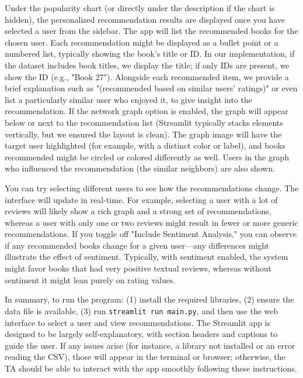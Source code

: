 \documentclass[11pt]{article}
\begin{document}
Under the popularity chart (or directly under the description if the chart is hidden), the personalized recommendation results are displayed once you have selected a user from the sidebar. The app will list the recommended books for the chosen user. Each recommendation might be displayed as a bullet point or a numbered list, typically showing the book’s title or ID. In our implementation, if the dataset includes book titles, we display the title; if only IDs are present, we show the ID (e.g., "Book 27"). Alongside each recommended item, we provide a brief explanation such as "(recommended based on similar users’ ratings)" or even list a particularly similar user who enjoyed it, to give insight into the recommendation. If the network graph option is enabled, the graph will appear below or next to the recommendation list (Streamlit typically stacks elements vertically, but we ensured the layout is clean). The graph image will have the target user highlighted (for example, with a distinct color or label), and books recommended might be circled or colored differently as well. Users in the graph who influenced the recommendation (the similar neighbors) are also shown.

You can try selecting different users to see how the recommendations change. The interface will update in real-time. For example, selecting a user with a lot of reviews will likely show a rich graph and a strong set of recommendations, whereas a user with only one or two reviews might result in fewer or more generic recommendations. If you toggle off "Include Sentiment Analysis," you can observe if any recommended books change for a given user—any differences might illustrate the effect of sentiment. Typically, with sentiment enabled, the system might favor books that had very positive textual reviews, whereas without sentiment it might lean purely on rating values.

In summary, to run the program: (1) install the required libraries, (2) ensure the data file is available, (3) run \texttt{streamlit run main.py}, and then use the web interface to select a user and view recommendations. The Streamlit app is designed to be largely self-explanatory, with section headers and captions to guide the user. If any issues arise (for instance, a library not installed or an error reading the CSV), those will appear in the terminal or browser; otherwise, the TA should be able to interact with the app smoothly following these instructions.
\end{document}
